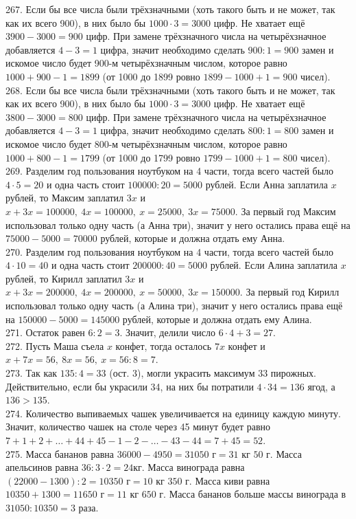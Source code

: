 \documentclass[12pt]{article}
\begin{document}
267. Если бы все числа были трёхзначными (хоть такого быть и не может, так как их всего 900), в них было бы $1000\cdot3=3000$ цифр. Не хватает ещё $3900-3000=900$ цифр. При замене трёхзначного числа на четырёхзначное добавляется $4-3=1$ цифра, значит необходимо сделать $900:1=900$ замен и искомое число будет 900-м четырёхзначным числом, которое равно $1000+900-1=1899$ (от 1000 до 1899 ровно $1899-1000+1=900$ чисел).\\
268. Если бы все числа были трёхзначными (хоть такого быть и не может, так как их всего 900), в них было бы $1000\cdot3=3000$ цифр. Не хватает ещё $3800-3000=800$ цифр. При замене трёхзначного числа на четырёхзначное добавляется $4-3=1$ цифра, значит необходимо сделать $800:1=800$ замен и искомое число будет 800-м четырёхзначным числом, которое равно $1000+800-1=1799$ (от 1000 до 1799 ровно $1799-1000+1=800$ чисел).\\
269. Разделим год пользования ноутбуком на 4 части, тогда всего частей было $4\cdot5=20$ и одна часть стоит $100000:20=5000$ рублей. Если Анна заплатила $x$ рублей, то Максим заплатил $3x$ и $x+3x=100000,\ 4x=100000,\ x=25000,\ 3x=75000.$ За первый год Максим использовал только одну часть (а Анна три), значит у него остались права ещё на $75000-5000=70000$ рублей, которые и должна отдать ему Анна.\\
270. Разделим год пользования ноутбуком на 4 части, тогда всего частей было $4\cdot10=40$ и одна часть стоит $200000:40=5000$ рублей. Если Алина заплатила $x$ рублей, то Кирилл заплатил $3x$ и $x+3x=200000,\ 4x=200000,\ x=50000,\ 3x=150000.$ За первый год Кирилл использовал только одну часть (а Алина три), значит у него остались права ещё на $150000-5000=145000$ рублей, которые и должна отдать ему Алина.\\
271. Остаток равен $6:2=3.$ Значит, делили число $6\cdot4+3=27.$\\
272. Пусть Маша съела $x$ конфет, тогда осталось  $7x$ конфет и $x+7x=56,\ 8x=56,\ x=56:8=7.$\\
273. Так как $135:4=33$ (ост. 3), могли украсить максимум 33 пирожных. Действительно, если бы украсили 34, на них бы потратили $4\cdot34=136$ ягод, а $136>135.$\\
274. Количество выпиваемых чашек увеличивается на единицу каждую минуту. Значит, количество чашек на столе через 45 минут будет равно $7+1+2+\ldots+44+45-1-2-\ldots-43-44=7+45=52.$\\
275. Масса бананов равна $36000-4950=31050\text{ г}=31\text{ кг }50\text{ г}.$ Масса апельсинов равна $36:3\cdot2=24$кг. Масса винограда равна $(22000-1300):2=10350\text{ г}=10\text{ кг }350\text{ г}.$ Масса киви равна $10350+1300=11650\text{ г}=11\text{ кг }650\text{ г}.$ Масса бананов больше массы винограда в $31050:10350=3$ раза.\\
\end{document}
